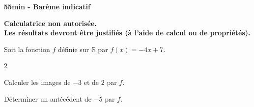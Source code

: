 \documentclass[11pt,a4paper]{article}  %
\begin{document}
\graphicspath{{images/}}

\begin{center}
\end{center}

\begin{center}\textbf{55min - Barème indicatif}\end{center}
\begin{center}\textbf{Calculatrice non autorisée.\\Les résultats devront être justifiés (à l'aide de calcul ou de propriétés).}\end{center}

\exerciceDS{}

Soit la fonction $f$ définie sur $\mathbb{R}$ par $f(x)=-4x+7$.
\begin{multicols}{2}
	\begin{enumMet}
		\item Calculer les images de $-3$ et de $2$ par $f$.
		\item Déterminer un antécédent de $-5$ par $f$.
	\end{enumMet}
\end{multicols}

\exerciceDS{}
\end{document}

